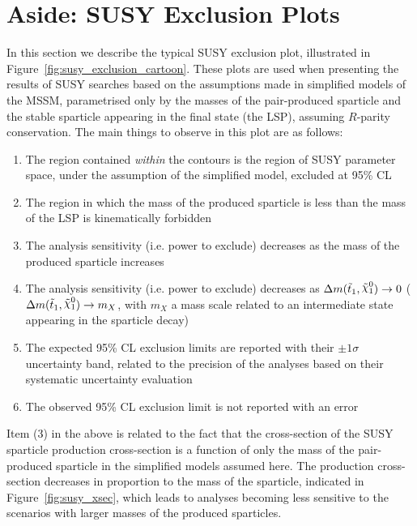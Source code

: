 
\FloatBarrier
\section{Aside: SUSY Exclusion Plots}
\label{sec:susy_exclusion_plots}

In this section we describe the typical SUSY exclusion plot, illustrated in Figure~\ref{fig:susy_exclusion_cartoon}.
These plots are used when presenting the results of SUSY searches based on the assumptions
made in simplified models of the MSSM, parametrised only by the masses of the
pair-produced sparticle and the stable sparticle appearing in the final state (the LSP), assuming $R$-parity
conservation. The main things to observe in this plot are as follows:

\begin{enumerate}
    \item The region contained \textit{within} the contours is the region of SUSY parameter space,
        under the assumption of the simplified model, excluded at 95\% CL
    \item The region in which the mass of the produced
        sparticle is less than the mass of the LSP is kinematically forbidden
    \item The analysis sensitivity (i.e. power to exclude) decreases as the mass of the produced sparticle increases
    \item The analysis sensitivity (i.e. power to exclude) decreases as $\sdiff \rightarrow 0$ ($\sdiff \rightarrow m_X$,
        with $m_X$ a mass scale related to an intermediate state appearing in the sparticle decay)
    \item The expected 95\% CL exclusion limits are reported with their $\pm 1 \sigma$ uncertainty band,
        related to the precision of the analyses based on their systematic uncertainty evaluation
    \item The observed 95\% CL exclusion limit is not reported with an error
\end{enumerate}

Item (3) in the above is related to the fact that the cross-section of the SUSY sparticle production cross-section
is a function of only the mass of the pair-produced sparticle in the simplified models assumed here.
The production cross-section decreases in proportion to the mass of the sparticle, indicated in Figure~\ref{fig:susy_xsec},
which leads to analyses becoming less sensitive to the scenarios with larger masses of the produced sparticles.

